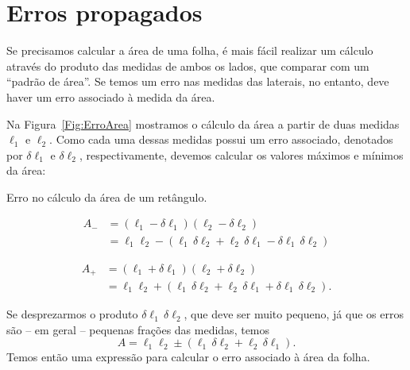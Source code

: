 \section{Erros propagados}

Se precisamos calcular a área de uma folha, é mais fácil realizar um cálculo através do produto das medidas de ambos os lados, que comparar com um ``padrão de área''. Se temos um erro nas medidas das laterais, no entanto, deve haver um erro associado à medida da área.

Na Figura~\ref{Fig:ErroArea} mostramos o cálculo da área a partir de duas medidas $\ell_1$ e $\ell_2$. Como cada uma dessas medidas possui um erro associado, denotados por $\delta\ell_1$ e $\delta\ell_2$, respectivamente, devemos calcular os valores máximos e mínimos da área:
%
\begin{marginfigure}[2cm]
\centering
{}
\caption{Erro no cálculo da área de um retângulo.}
\label{Fig:ErroArea}
\end{marginfigure}
%
\begin{align}
	A_{-} &= (\ell_1 - \delta\ell_1)(\ell_2 - \delta\ell_2) \\
	&= \ell_1\ell_2 - (\ell_1 \,\delta\ell_2 + \ell_2\,\delta\ell_1 - \delta\ell_1\,\delta\ell_2)
\end{align}

\begin{align}
	A_{+} &= (\ell_1 + \delta\ell_1)(\ell_2 + \delta\ell_2) \\
	&= \ell_1\ell_2 + (\ell_1 \,\delta\ell_2 + \ell_2\,\delta\ell_1 + \delta\ell_1\,\delta\ell_2).
\end{align}

\noindent{}Se desprezarmos o produto $\delta\ell_1\,\delta\ell_2$, que deve ser muito pequeno, já que os erros são -- em geral -- pequenas frações das medidas, temos
\begin{equation}
	A = \ell_1\ell_2 \pm (\ell_1\,\delta\ell_2+\ell_2\,\delta\ell_1).
\end{equation}
%
Temos então uma expressão para calcular o erro associado à área da folha. 

